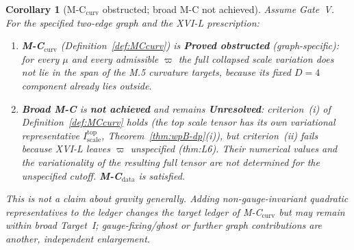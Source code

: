 \documentclass{article}
\newtheorem{corollary}[proposition]{Corollary}
\theoremstyle{remark}
\begin{document}
\begin{corollary}[M-C$_{\mathrm{curv}}$ obstructed; broad M-C not achieved]
\label{cor:wpB-MC}
Assume Gate~V. For the specified two-edge graph and the XVI-L prescription:
\begin{enumerate}
\item \textbf{M-C$_{\mathrm{curv}}$} (Definition~\ref{def:MCcurv}) is \textbf{Proved obstructed} (graph-specific): for every $\mu$ and every admissible $\varpi$ the full collapsed scale variation does not lie in the span of the M.5 curvature targets, because its fixed $D=4$ component already lies outside.
\item \textbf{Broad M-C} is \textbf{not achieved} and remains \textbf{Unresolved}: criterion~(i) of Definition~\ref{def:MCcurv} holds (the top scale tensor has its own variational representative $I^{\mathrm{top}}_{\mathrm{scale}}$, Theorem~\ref{thm:wpB-dp}(i)), but criterion~(ii) fails because XVI-L leaves $\varpi$ unspecified (thm:L6). Their numerical values and the variationality of the resulting full tensor are not determined for the unspecified cutoff. \textbf{M-C$_{\mathrm{data}}$} is satisfied.
\end{enumerate}
This is not a claim about gravity generally. Adding non-gauge-invariant quadratic representatives to the ledger changes the target ledger of M-C$_{\mathrm{curv}}$ but may remain within broad Target~I; gauge-fixing/ghost or further graph contributions are another, independent enlargement.
\end{corollary}
\end{document}
